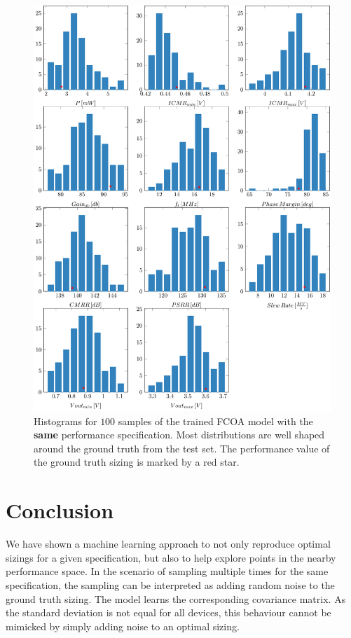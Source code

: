 \documentclass[conference]{IEEEtran}
\begin{document}
		
	\begin{figure}[]
		\centering
		\includegraphics[width=\linewidth]{figures/histograms_simple53_100samples}
		\caption{Histograms for $100$ samples of the trained FCOA model with the \textbf{same} performance specification. Most distributions are well shaped around the ground truth from the test set. The performance value of the ground truth sizing is marked by a red star.}
		\label{fig:histograms53}
	\end{figure}
	
	
\section{Conclusion}
	We have shown a machine learning approach to not only reproduce optimal sizings for a given specification, but also to help explore points in the nearby performance space. In the scenario of sampling multiple times for the same specification, the sampling can be interpreted as adding random noise to the ground truth sizing. The model learns the corresponding covariance matrix. As the standard deviation is not equal for all devices, this behaviour cannot be mimicked by simply adding noise to an optimal sizing.



\end{document}

